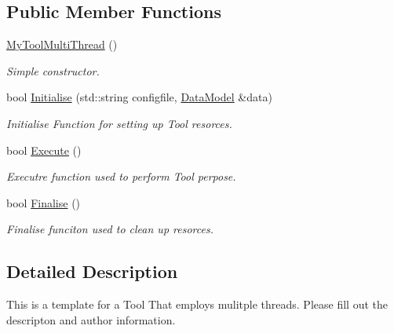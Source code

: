 \subsection*{Public Member Functions}
\begin{DoxyCompactItemize}
\item 
\hypertarget{classMyToolMultiThread_ac24f005c6da9c552871f6ff2672cf7f1}{\hyperlink{classMyToolMultiThread_ac24f005c6da9c552871f6ff2672cf7f1}{My\-Tool\-Multi\-Thread} ()}\label{classMyToolMultiThread_ac24f005c6da9c552871f6ff2672cf7f1}

\begin{DoxyCompactList}\small\item\em Simple constructor. \end{DoxyCompactList}\item 
bool \hyperlink{classMyToolMultiThread_a19dc55079a7b2da02ad9addd565b8e80}{Initialise} (std\-::string configfile, \hyperlink{classDataModel}{Data\-Model} \&data)
\begin{DoxyCompactList}\small\item\em Initialise Function for setting up Tool resorces. \end{DoxyCompactList}\item 
\hypertarget{classMyToolMultiThread_a9cd7c894fc4797b2d81e12e25eb5beec}{bool \hyperlink{classMyToolMultiThread_a9cd7c894fc4797b2d81e12e25eb5beec}{Execute} ()}\label{classMyToolMultiThread_a9cd7c894fc4797b2d81e12e25eb5beec}

\begin{DoxyCompactList}\small\item\em Executre function used to perform Tool perpose. \end{DoxyCompactList}\item 
\hypertarget{classMyToolMultiThread_a8f25561dc6a5daf8f4db85afecbb2c38}{bool \hyperlink{classMyToolMultiThread_a8f25561dc6a5daf8f4db85afecbb2c38}{Finalise} ()}\label{classMyToolMultiThread_a8f25561dc6a5daf8f4db85afecbb2c38}

\begin{DoxyCompactList}\small\item\em Finalise funciton used to clean up resorces. \end{DoxyCompactList}\end{DoxyCompactItemize}


\subsection{Detailed Description}
This is a template for a Tool That employs mulitple threads. Please fill out the descripton and author information.

